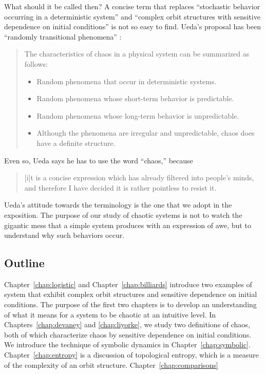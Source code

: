 \documentclass[10pt,twoside]{book}
\begin{document}
What should it be called then?
A concise term that replaces ``stochastic behavior occurring in a deterministic system'' and ``complex orbit structures with sensitive dependence on initial conditions'' is not so easy to find.
Ueda's proposal has been ``randomly transitional phenomena'' \citep[p.24]{ueda-abraham}:
\begin{quotation}
  The characteristics of chaos in a physical system can be summarized as follows:
  \begin{itemize}
    \item Random phenomena that occur in deterministic systems.
    \item Random phenomena whose short-term behavior is predictable.
    \item Random phenomena whose long-term behavior is unpredictable.
    \item Although the phenomena are irregular and unpredictable, chaos does have a definite structure.
  \end{itemize}
\end{quotation}
Even so, Ueda says he has to use the word ``chaos,'' because
\begin{quotation}
  [i]t is a concise expression which has already filtered into people's minds, and therefore I have decided it is rather pointless to resist it.
\end{quotation}
Ueda's attitude towards the terminology is the one that we adopt in the exposition.
The purpose of our study of chaotic systems is not to watch the gigantic mess that a simple system produces with an expression of awe, but to understand why such behaviors occur.


\subsection*{Outline}
Chapter~\ref{chap:logistic} and Chapter~\ref{chap:billiards} introduce two examples of system that exhibit complex orbit structures and sensitive dependence on initial conditions.
The purpose of the first two chapters is to develop an understanding of what it means for a system to be chaotic at an intuitive level.
In Chapters~\ref{chap:devaney} and \ref{chap:liyorke}, we study two definitions of chaos, both of which characterize chaos by sensitive dependence on initial conditions.
We introduce the technique of symbolic dynamics in Chapter~\ref{chap:symbolic}.
Chapter~\ref{chap:entropy} is a discussion of topological entropy, which is a measure of the complexity of an orbit structure. 
Chapter~\ref{chap:comparisons}
\end{document}
